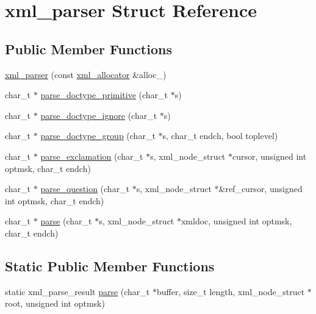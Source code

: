 \hypertarget{structxml__parser}{
\section{xml\_\-parser Struct Reference}
\label{structxml__parser}
}
\subsection*{Public Member Functions}
\begin{DoxyCompactItemize}
\item 
\hyperlink{structxml__parser_acc030c4ed339b238e1ff2d3e6fa7188b}{xml\_\-parser} (const \hyperlink{structxml__allocator}{xml\_\-allocator} \&alloc\_\-)
\item 
char\_\-t $\ast$ \hyperlink{structxml__parser_a722853b603ad9a1d1f61bb8115bea5b4}{parse\_\-doctype\_\-primitive} (char\_\-t $\ast$s)
\item 
char\_\-t $\ast$ \hyperlink{structxml__parser_a1e996ac9c9993f1939128859596376a1}{parse\_\-doctype\_\-ignore} (char\_\-t $\ast$s)
\item 
char\_\-t $\ast$ \hyperlink{structxml__parser_a9bc0e5f3d75cd7edb267a85430e1cdfc}{parse\_\-doctype\_\-group} (char\_\-t $\ast$s, char\_\-t endch, bool toplevel)
\item 
char\_\-t $\ast$ \hyperlink{structxml__parser_a40da52e4b27a0a06752930a0edf16fe9}{parse\_\-exclamation} (char\_\-t $\ast$s, xml\_\-node\_\-struct $\ast$cursor, unsigned int optmsk, char\_\-t endch)
\item 
char\_\-t $\ast$ \hyperlink{structxml__parser_a2b0edc4fbf2ff448b4d5b31593c5c4fd}{parse\_\-question} (char\_\-t $\ast$s, xml\_\-node\_\-struct $\ast$\&ref\_\-cursor, unsigned int optmsk, char\_\-t endch)
\item 
char\_\-t $\ast$ \hyperlink{structxml__parser_a00626800a3d535c14273c48238c03a70}{parse} (char\_\-t $\ast$s, xml\_\-node\_\-struct $\ast$xmldoc, unsigned int optmsk, char\_\-t endch)
\end{DoxyCompactItemize}
\subsection*{Static Public Member Functions}
\begin{DoxyCompactItemize}
\item 
static xml\_\-parse\_\-result \hyperlink{structxml__parser_a116885dc8aaf5fcd025511def4605674}{parse} (char\_\-t $\ast$buffer, size\_\-t length, xml\_\-node\_\-struct $\ast$root, unsigned int optmsk)
\end{DoxyCompactItemize}
